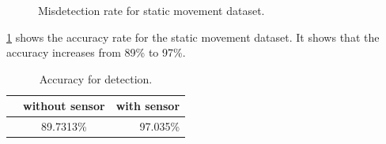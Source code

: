 \begin{figure}[!ht]
\centering
{}
\hfill
{}
\caption{Misdetection rate for static movement dataset.}
\label{f:fp_stat}
\end{figure}

\ref{t:acc_stat} shows the accuracy rate for the static movement dataset.
It shows that the accuracy increases from 89\% to 97\%.

\begin{table}[h!]
  \centering
  \caption{Accuracy for detection.}
  \label{t:acc_stat}
  \begin{tabular}{  l  c | r  }
   
     & without sensor & with sensor  \\
    \hline
    & 89.7313\% & 97.035\%  \\
    \hline
  \end{tabular}
\end{table}





